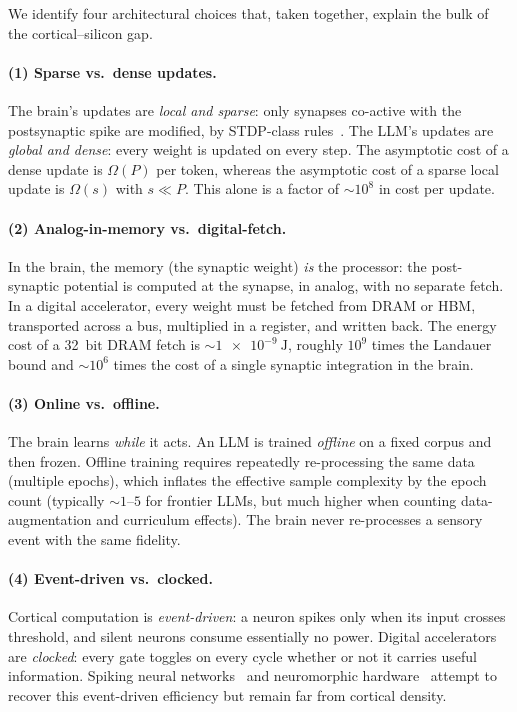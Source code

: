 \documentclass[11pt]{article}
\providecommand{\joule}{\ensuremath{\mathrm{J}}}
\providecommand{\bit}{\ensuremath{\mathrm{bit}}}
\theoremstyle{definition}
\theoremstyle{remark}
\begin{document}
We identify four architectural choices that, taken together, explain
the bulk of the cortical--silicon gap.

\paragraph{(1) Sparse vs.\ dense updates.}
The brain's updates are \emph{local and sparse}: only synapses
co-active with the postsynaptic spike are modified, by STDP-class
rules~\cite{bi2001synaptic, markram2011history}.  The LLM's updates
are \emph{global and dense}: every weight is updated on every step.
The asymptotic cost of a dense update is $\Omega(P)$ per token,
whereas the asymptotic cost of a sparse local update is
$\Omega(s)$ with $s \ll P$.  This alone is a factor of $\sim 10^{8}$
in cost per update.

\paragraph{(2) Analog-in-memory vs.\ digital-fetch.}
In the brain, the memory (the synaptic weight) \emph{is} the
processor: the post-synaptic potential is computed at the synapse, in
analog, with no separate fetch.  In a digital accelerator, every
weight must be fetched from DRAM or HBM, transported across a bus,
multiplied in a register, and written back.  The energy cost of a
\SI{32}{\bit} DRAM fetch is $\sim\!\SI{1e-9}{\joule}$, roughly
$10^{9}$ times the Landauer bound and $\sim 10^{6}$ times the cost of
a single synaptic integration in the brain.

\paragraph{(3) Online vs.\ offline.}
The brain learns \emph{while} it acts.  An LLM is trained
\emph{offline} on a fixed corpus and then frozen.  Offline training
requires repeatedly re-processing the same data (multiple epochs),
which inflates the effective sample complexity by the epoch count
(typically $\sim\!1$--$5$ for frontier LLMs, but much higher when
counting data-augmentation and curriculum effects).  The brain never
re-processes a sensory event with the same fidelity.

\paragraph{(4) Event-driven vs.\ clocked.}
Cortical computation is \emph{event-driven}: a neuron spikes only
when its input crosses threshold, and silent neurons consume
essentially no power.  Digital accelerators are \emph{clocked}: every
gate toggles on every cycle whether or not it carries useful
information.  Spiking neural networks~\cite{roy2019spiking,
eshraghian2021training} and neuromorphic hardware~\cite{davies2018loihi,
merolla2014million} attempt to recover this event-driven efficiency
but remain far from cortical density.
\end{document}
